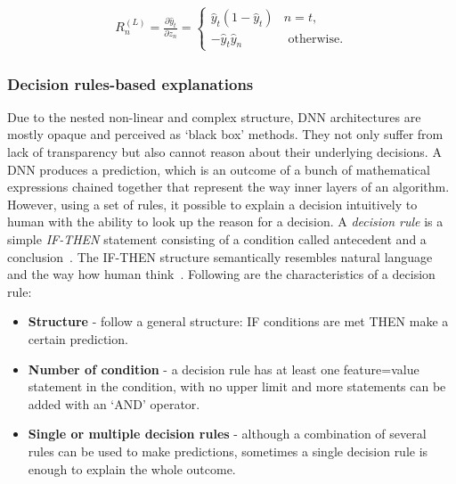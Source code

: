 \vspace{-2mm}
\begin{align}
        R_{n}^{(L)}=\frac{\partial \hat{y}_{t}}{\partial z_{n}}=\left\{\begin{array}{ll}
        {\hat{y}_{t}\left(1-\hat{y}_{t}\right)} & {n=t}, \\
        {-\hat{y}_{t} \hat{y}_{n}} & {\text { otherwise.}}
    \end{array}\right.
\end{align}

\subsubsection{Decision rules-based explanations}
Due to the nested non-linear and complex structure, DNN architectures are mostly opaque and perceived as `black box' methods. They not only suffer from lack of transparency but also cannot reason about their underlying decisions. A DNN produces a prediction, which is an outcome of a bunch of mathematical expressions chained together that represent the way inner layers of an algorithm. However, using a set of rules, it possible to explain a decision intuitively to human with the ability to look up the reason for a decision. A \textit{decision rule} is a simple \textit{IF-THEN} statement consisting of a condition called antecedent and a conclusion~\cite{molnar2019interpretable}. The IF-THEN structure semantically resembles natural language and the way how human think~\cite{molnar2019interpretable}. Following are the characteristics of a decision rule: 

\begin{itemize}[noitemsep]
    \item \textbf{Structure} - follow a general structure: IF conditions are met THEN make a certain prediction. 
    \item \textbf{Number of condition} - a decision rule has at least one feature=value statement in the condition, with no upper limit and more statements can be added with an ‘AND’ operator. 
    \item \textbf{Single or multiple decision rules} - although a combination of several rules can be used to make predictions, sometimes a single decision rule is enough to explain the whole outcome.
\end{itemize}

